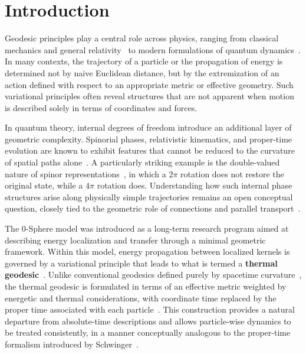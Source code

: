 \documentclass[%
 reprint,
 amsmath,amssymb,
 aps,
 prb,
]{revtex4-2}
\numberwithin{equation}{section}
\begin{document}
\maketitle

\section{Introduction}
\label{sec:introduction}

Geodesic principles play a central role across physics, ranging from classical mechanics and general relativity~\cite{misner1973,wald1984,weinberg1972} to modern formulations of quantum dynamics~\cite{feynman1949,peskin1995}. In many contexts, the trajectory of a particle or the propagation of energy is determined not by naive Euclidean distance, but by the extremization of an action defined with respect to an appropriate metric or effective geometry. Such variational principles often reveal structures that are not apparent when motion is described solely in terms of coordinates and forces.

In quantum theory, internal degrees of freedom introduce an additional layer of geometric complexity. Spinorial phases, relativistic kinematics, and proper-time evolution are known to exhibit features that cannot be reduced to the curvature of spatial paths alone~\cite{wigner1939,bargmann1954,dirac1928}. A particularly striking example is the double-valued nature of spinor representations~\cite{sakurai2017,shankar2016}, in which a $2\pi$ rotation does not restore the original state, while a $4\pi$ rotation does. Understanding how such internal phase structures arise along physically simple trajectories remains an open conceptual question, closely tied to the geometric role of connections and parallel transport~\cite{nakahara2003,berry1984}.

The 0-Sphere model was introduced as a long-term research program aimed at describing energy localization and transfer through a minimal geometric framework. Within this model, energy propagation between localized kernels is governed by a variational principle that leads to what is termed a \textbf{thermal geodesic}~\cite{hanamura17765017}. Unlike conventional geodesics defined purely by spacetime curvature~\cite{misner1973,wald1984}, the thermal geodesic is formulated in terms of an effective metric weighted by energetic and thermal considerations, with coordinate time replaced by the proper time associated with each particle~\cite{bjorken1964,ryder1996}. This construction provides a natural departure from absolute-time descriptions and allows particle-wise dynamics to be treated consistently, in a manner conceptually analogous to the proper-time formalism introduced by Schwinger~\cite{schwinger1951}.
\end{document}
